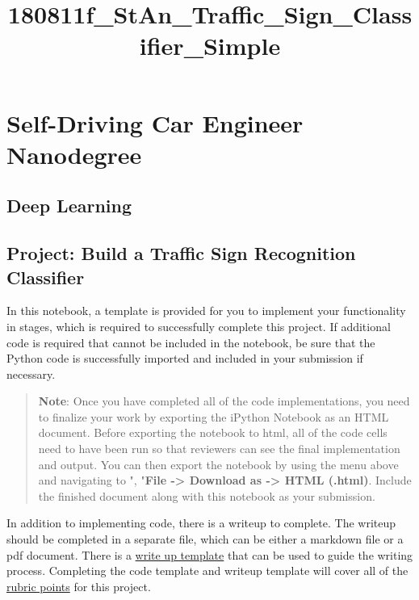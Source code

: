 \documentclass[11pt]{article}
\title{180811f\_StAn\_Traffic\_Sign\_Classifier\_Simple}
\begin{document}
    
    
    \maketitle
    
    

    
    \section{Self-Driving Car Engineer
Nanodegree}\label{self-driving-car-engineer-nanodegree}

\subsection{Deep Learning}\label{deep-learning}

\subsection{Project: Build a Traffic Sign Recognition
Classifier}\label{project-build-a-traffic-sign-recognition-classifier}

In this notebook, a template is provided for you to implement your
functionality in stages, which is required to successfully complete this
project. If additional code is required that cannot be included in the
notebook, be sure that the Python code is successfully imported and
included in your submission if necessary.

\begin{quote}
\textbf{Note}: Once you have completed all of the code implementations,
you need to finalize your work by exporting the iPython Notebook as an
HTML document. Before exporting the notebook to html, all of the code
cells need to have been run so that reviewers can see the final
implementation and output. You can then export the notebook by using the
menu above and navigating to \n", "\textbf{File -\textgreater{} Download
as -\textgreater{} HTML (.html)}. Include the finished document along
with this notebook as your submission.
\end{quote}

In addition to implementing code, there is a writeup to complete. The
writeup should be completed in a separate file, which can be either a
markdown file or a pdf document. There is a
\href{https://github.com/udacity/CarND-Traffic-Sign-Classifier-Project/blob/master/writeup_template.md}{write
up template} that can be used to guide the writing process. Completing
the code template and writeup template will cover all of the
\href{https://review.udacity.com/\#!/rubrics/481/view}{rubric points}
for this project.
\end{document}

